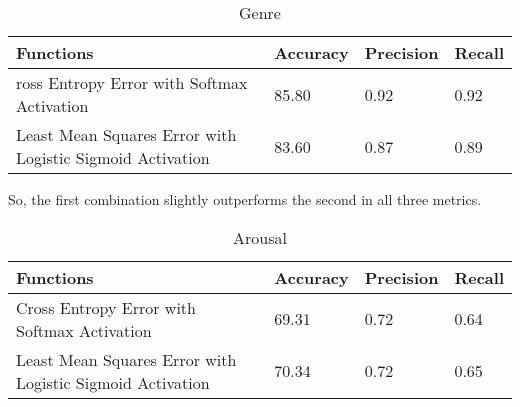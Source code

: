 \begin{table}[h!]
        \caption{Genre}
        \begin{center}
                \begin{tabular}{|l|l|l|l|}
                        \hline

                        Functions
                        &
                        Accuracy
                        &
                        Precision
                        &
                        Recall
                        \\\hline

ross Entropy Error with Softmax Activation
&
85.80%
&
0.92
&
0.92
\\\hline

Least Mean Squares Error with Logistic Sigmoid Activation 
&
83.60%
&
0.87
&
0.89
\\\hline
                 \end{tabular}
        \end{center}
\end{table}
So, the first combination slightly outperforms the second in all three metrics. 
\begin{table}[h!]
        \caption{Arousal}
        \begin{center}
                \begin{tabular}{|l|l|l|l|}
                        \hline

                        Functions
                        &
                        Accuracy
                        &
                        Precision
                        &
                        Recall
                        \\\hline

                        Cross Entropy Error with Softmax Activation
                        &
                        69.31%
                        &
                        0.72
                        &
                        0.64
                        \\\hline
                        
                        Least Mean Squares Error with Logistic Sigmoid Activation 
                        &
                        70.34%
                        &
                        0.72
                        &
                        0.65
                        \\\hline

                 \end{tabular}
        \end{center}
\end{table}
